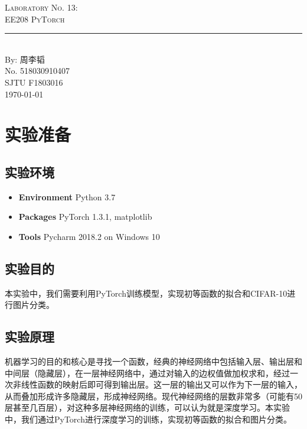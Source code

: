 \documentclass{article}
\newcommand{\labno}{13}
\newcommand{\labtitle}{EE208 PyTorch}
\newcommand{\authorname}{周李韬}
\newcommand{\studentno}{518030910407}
\newcommand{\classno}{F1803016}
\begin{document}
\begin{center}
{\LARGE \textsc{Laboratory No. \labno:} \\ \vspace{4pt}}
{\Large \textsc{\labtitle} \\ \vspace{4pt}} 
\rule[13pt]{\textwidth}{1pt} \\ \vspace{15pt}
{\large By: \authorname \\ \vspace{10pt}
No. \studentno \\ \vspace{10pt}
SJTU \classno \\ \vspace{10pt}
\today \vspace{20pt}}
\end{center}



\section{实验准备}

\subsection{实验环境}
\begin{itemize}
\item\textbf{Environment} Python 3.7
\item\textbf{Packages} PyTorch 1.3.1, matplotlib
\item\textbf{Tools} Pycharm 2018.2 on Windows 10
\end{itemize}

\subsection{实验目的}

本实验中，我们需要利用PyTorch训练模型，实现初等函数的拟合和CIFAR-10进行图片分类。

\subsection{实验原理}
机器学习的目的和核心是寻找一个函数，经典的神经网络中包括输入层、输出层和中间层（隐藏层），在一层神经网络中，通过对输入的边权值做加权求和，经过一次非线性函数的映射后即可得到输出层。这一层的输出又可以作为下一层的输入，从而叠加形成许多隐藏层，形成神经网络。现代神经网络的层数非常多（可能有50层甚至几百层），对这种多层神经网络的训练，可以认为就是深度学习。本实验中，我们通过PyTorch进行深度学习的训练，实现初等函数的拟合和图片分类。
\end{document}
